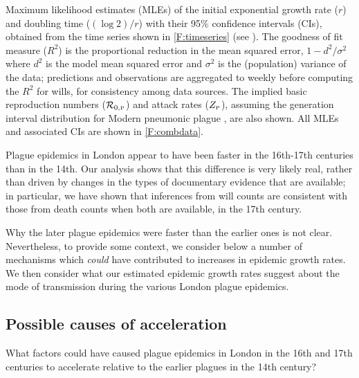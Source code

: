 \begin{table}[h!] 
  \caption[Estimated $r$ and $1/r$]{Maximum likelihood estimates (MLEs) of the initial exponential growth rate ($r$) and doubling time ($(\log2)/r$) with their 95\% confidence intervals (CIs), obtained from the time series shown in \cref{F:timeseries} (see \Methodslink).  The goodness of fit measure ($R^2$) is the proportional reduction in the mean squared error, \ie $1-d^2/\sigma^2$ where $d^2$ is the model mean squared error and $\sigma^2$ is the (population) variance of the data; predictions and observations are aggregated to weekly before computing the $R^2$ for wills, for consistency among data sources. The implied basic reproduction numbers (${\mathcal R}_{0,\mbox{\tiny P}}$) and attack rates ($Z_{\mbox{\tiny P}}$), assuming the generation interval distribution for Modern pneumonic plague \cite{GaniLeac04}, are also shown.
All MLEs and associated CIs are shown in \cref{F:combdata}.
}
\begin{center}
  \footnotesize
  

\end{center}
\label{tab:params}
\end{table}

\FloatBarrier
{}

Plague epidemics in London appear to have been faster in the 16th-17th centuries than in the 14th. Our analysis shows that this difference is very likely real, rather than driven by changes in the types of documentary evidence that are available; in particular, we have shown that inferences from will counts are consistent with those from death counts when both are available, in the 17th century.

Why the later plague epidemics were faster than the earlier ones is not clear.  Nevertheless, to provide some context, we consider below a number of mechanisms which \emph{could} have contributed to increases in epidemic growth rates.  We then consider what our estimated epidemic growth rates suggest about the mode of transmission during the various London plague epidemics.

\subsection*{Possible causes of acceleration}

What factors could have caused plague epidemics in London in the 16th and 17th centuries to accelerate relative to the earlier plagues in the 14th century?

